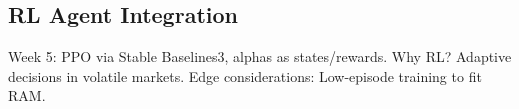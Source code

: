 \subsection{RL Agent Integration}
\label{sec:rlagent}

Week 5: PPO via Stable Baselines3, alphas as states/rewards. Why RL? Adaptive decisions in volatile markets. Edge considerations: Low-episode training to fit RAM.